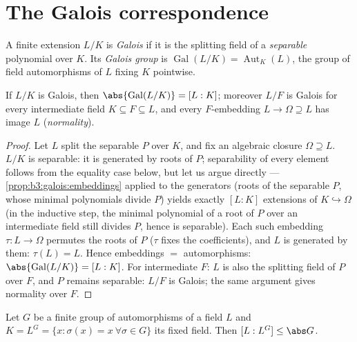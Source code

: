 \section{The Galois correspondence}

\begin{definition}\label{def:b3:galois:galois}
A finite extension $L/K$ is \emph{Galois}
if it is the splitting field of a \emph{separable} polynomial
over $K$. Its \emph{Galois group} is
$\operatorname{Gal}(L/K) = \operatorname{Aut}_K(L)$, the group of
field automorphisms of $L$ fixing $K$ pointwise.
\end{definition}

\begin{proposition}\label{prop:b3:galois:galoisorder}
If $L/K$ is Galois, then $\abs{\operatorname{Gal}(L/K)} =
[L:K]$; moreover $L/F$ is Galois for every intermediate field $K
\subseteq F \subseteq L$, and every $F$-embedding $L \to \Omega
\supseteq L$ has image $L$ (\emph{normality}).
\end{proposition}

\begin{proof}
Let $L$ split the separable $P$ over $K$, and fix an algebraic
closure $\Omega \supseteq L$. $L/K$ is separable: it is generated
by roots of $P$; separability of every element follows from the
equality case below, but let us argue directly ---
\cref{prop:b3:galois:embeddings} applied to the generators (roots
of the separable $P$, whose minimal polynomials divide $P$)
yields exactly $[L:K]$ extensions of $K \hookrightarrow \Omega$
(in the inductive step, the minimal polynomial of a root of $P$
over an intermediate field still divides $P$, hence is
separable). Each such embedding $\tau \colon L \to \Omega$
permutes the roots of $P$ ($\tau$ fixes the coefficients), and
$L$ is generated by them: $\tau(L) = L$. Hence embeddings $=$
automorphisms: $\abs{\operatorname{Gal}(L/K)} = [L:K]$. For
intermediate $F$: $L$ is also the splitting field of $P$ over
$F$, and $P$ remains separable: $L/F$ is Galois; the same
argument gives normality over $F$.
\end{proof}

\begin{lemma}[Artin]\label{lem:b3:galois:artin}
Let $G$ be a finite group of automorphisms of a field $L$ and
$K = L^G = \{x : \sigma(x) = x\ \forall\sigma \in G\}$ its fixed
field. Then $[L : L^G] \leq \abs G$.
\end{lemma}

